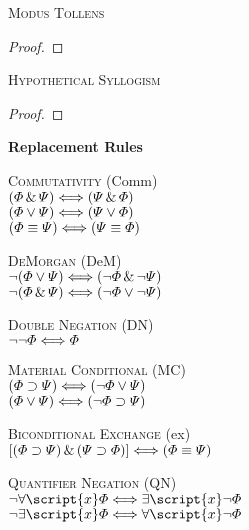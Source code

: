 \textsc{Modus Tollens}

\begin{proof}
	 
\end{proof}

\textsc{Hypothetical Syllogism}

\begin{proof}
\end{proof}



{\large \bf Replacement Rules}


\textsc{Commutativity} (Comm)\\
$(\varPhi{}\,\&\,\varPsi{}) \Longleftrightarrow (\varPsi{}\,\&\,\varPhi{})$\\
$(\varPhi{}\vee\varPsi{}) \Longleftrightarrow (\varPsi{}\vee\varPhi{})$\\
$(\varPhi{}\equiv\varPsi{}) \Longleftrightarrow (\varPsi{}\equiv\varPhi{})$

\textsc{DeMorgan} (DeM)\\
$\neg(\varPhi{}\vee\varPsi{}) \Longleftrightarrow (\neg\varPhi{}\,\&\,\neg\varPsi{})$\\
$\neg(\varPhi{}\,\&\,\varPsi{}) \Longleftrightarrow (\neg\varPhi{}\vee\neg\varPsi{})$

\textsc{Double Negation} (DN)\\
$\neg\neg\varPhi{} \Longleftrightarrow \varPhi{}$

\textsc{Material Conditional} (MC)\\
$(\varPhi{}\supset\varPsi{}) \Longleftrightarrow (\neg\varPhi{}\vee\varPsi{})$\\
$(\varPhi{}\vee\varPsi{}) \Longleftrightarrow (\neg\varPhi{}\supset\varPsi{})$

\textsc{Biconditional Exchange} ({\eiff}{ex})\\
$[(\varPhi{}\supset\varPsi{})\,\&\,(\varPsi{}\supset\varPhi{})] \Longleftrightarrow (\varPhi{}\equiv\varPsi{})$

\textsc{Quantifier Negation} (QN)\\
$\enot\forall\script{x}\metaA{} \Longleftrightarrow \exists\script{x}\enot\metaA{}$\\
$\enot\exists\script{x}\metaA{} \Longleftrightarrow \forall\script{x}\enot\metaA{}$
